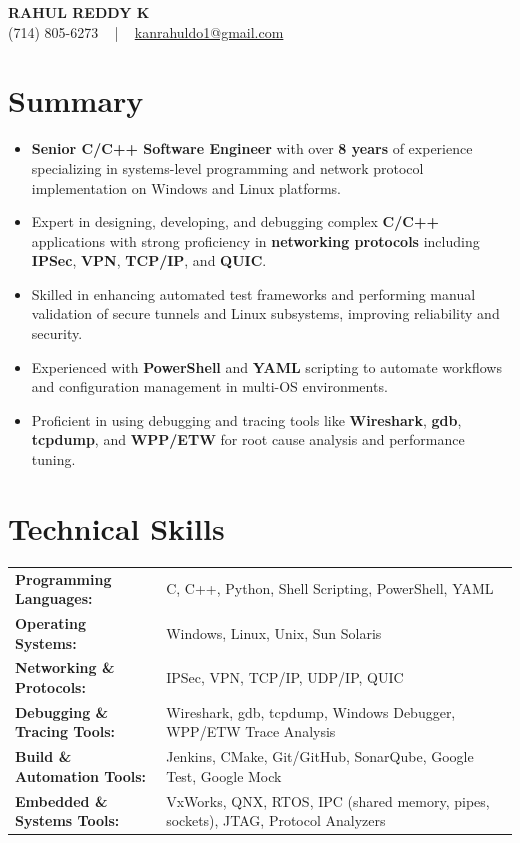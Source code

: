 \documentclass[letterpaper,11pt]{article}
\newcommand{\resumeItem}[1]{
  \item\footnotesize{
    {#1 \vspace{-2pt}}
  }
}
\newcommand{\resumeItemListStart}{\begin{itemize}[leftmargin=*]}
\newcommand{\resumeItemListEnd}{\end{itemize}\vspace{-5pt}}
\begin{document}
\begin{center}
    {\fontsize{14pt}{12pt}\selectfont \textbf{\MakeUppercase{Rahul Reddy K}}}\\ \vspace{2pt}
    \fontsize{10pt}{12pt}\selectfont (714) 805-6273 ~ | ~ \href{mailto:kanrahuldo1@gmail.com}{kanrahuldo1@gmail.com}~
    \vspace{-8pt}
\end{center}

\section{Summary}
\fontsize{9pt}{10pt}\selectfont
\resumeItemListStart
    \resumeItem{\textbf{Senior C/C++ Software Engineer} with over \textbf{8 years} of experience specializing in systems-level programming and network protocol implementation on Windows and Linux platforms.}
    \resumeItem{Expert in designing, developing, and debugging complex \textbf{C/C++} applications with strong proficiency in \textbf{networking protocols} including \textbf{IPSec}, \textbf{VPN}, \textbf{TCP/IP}, and \textbf{QUIC}.}
    \resumeItem{Skilled in enhancing automated test frameworks and performing manual validation of secure tunnels and Linux subsystems, improving reliability and security.}
    \resumeItem{Experienced with \textbf{PowerShell} and \textbf{YAML} scripting to automate workflows and configuration management in multi-OS environments.}
    \resumeItem{Proficient in using debugging and tracing tools like \textbf{Wireshark}, \textbf{gdb}, \textbf{tcpdump}, and \textbf{WPP/ETW} for root cause analysis and performance tuning.}
\resumeItemListEnd
\vspace{-6pt}

\section{Technical Skills}
        \vspace{-14pt}
        \begin{table}[h]
            \fontsize{9pt}{10pt}\selectfont
            \begin{tabular}{p{0.3\linewidth} p{0.7\linewidth}}
                \textbf{Programming Languages:} & C, C++, Python, Shell Scripting, PowerShell, YAML \\
                \textbf{Operating Systems:} & Windows, Linux, Unix, Sun Solaris \\
                \textbf{Networking \& Protocols:} & IPSec, VPN, TCP/IP, UDP/IP, QUIC \\
                \textbf{Debugging \& Tracing Tools:} & Wireshark, gdb, tcpdump, Windows Debugger, WPP/ETW Trace Analysis \\
                \textbf{Build \& Automation Tools:} & Jenkins, CMake, Git/GitHub, SonarQube, Google Test, Google Mock \\
                \textbf{Embedded \& Systems Tools:} & VxWorks, QNX, RTOS, IPC (shared memory, pipes, sockets), JTAG, Protocol Analyzers \\
            \end{tabular}
        \end{table}
    \vspace{-15pt}
\end{document}
